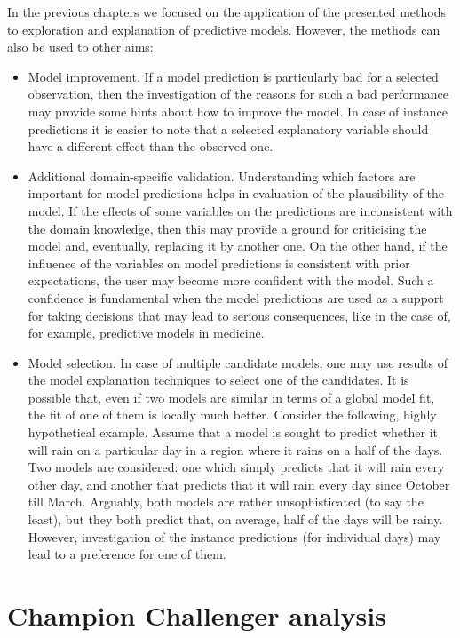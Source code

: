 \documentclass[]{krantz}
\begin{document}
In the previous chapters we focused on the application of the presented methods to exploration and explanation of predictive models. However, the methods can also be used to other aims:

\begin{itemize}
\item
  Model improvement. If a model prediction is particularly bad for a selected observation, then the investigation of the reasons for such a bad performance may provide some hints about how to improve the model. In case of instance predictions it is easier to note that a selected explanatory variable should have a different effect than the observed one.
\item
  Additional domain-specific validation. Understanding which factors are important for model predictions helps in evaluation of the plausibility of the model. If the effects of some variables on the predictions are inconsistent with the domain knowledge, then this may provide a ground for criticising the model and, eventually, replacing it by another one. On the other hand, if the influence of the variables on model predictions is consistent with prior expectations, the user may become more confident with the model. Such a confidence is fundamental when the model predictions are used as a support for taking decisions that may lead to serious consequences, like in the case of, for example, predictive models in medicine.
\item
  Model selection. In case of multiple candidate models, one may use results of the model explanation techniques to select one of the candidates. It is possible that, even if two models are similar in terms of a global model fit, the fit of one of them is locally much better. Consider the following, highly hypothetical example. Assume that a model is sought to predict whether it will rain on a particular day in a region where it rains on a half of the days. Two models are considered: one which simply predicts that it will rain every other day, and another that predicts that it will rain every day since October till March. Arguably, both models are rather unsophisticated (to say the least), but they both predict that, on average, half of the days will be rainy. However, investigation of the instance predictions (for individual days) may lead to a preference for one of them.
\end{itemize}

\hypertarget{champion-challenger-analysis-1}{%
\section{Champion Challenger analysis}\label{champion-challenger-analysis-1}}
\end{document}
